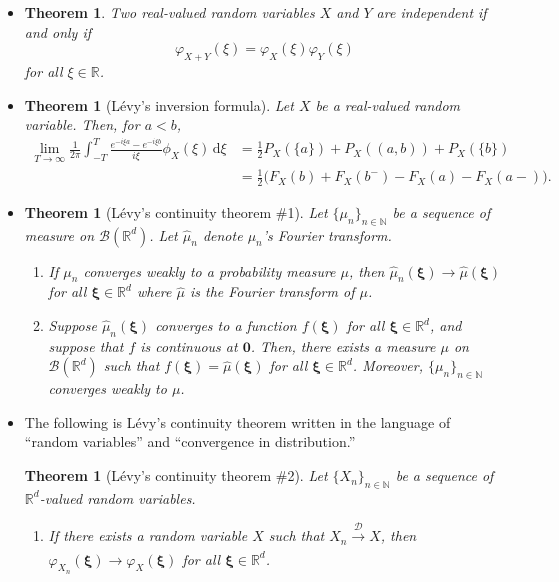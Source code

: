 \documentclass[10pt]{article}
\newtheorem{theorem}[lemma]{Theorem}
\numberwithin{lemma}{section}
\newcommand{\dee}{\mathrm{d}}
\newcommand{\ve}[1]{\mathbf{#1}}
\newcommand{\ves}[1]{\boldsymbol{#1}}
\newcommand{\ra}{\rightarrow}
\newcommand{\mcal}[1]{\mathcal{#1}}
\newcommand{\Real}{\mathbb{R}}
\newcommand{\Nat}{\mathbb{N}}
\begin{document}
\begin{itemize}
  \item \begin{theorem}
    Two real-valued random variables $X$ and $Y$ are independent if and only if $$\varphi_{X+Y}(\xi) = \varphi_X(\xi) \varphi_Y(\xi)$$ for all $\xi \in \Real$.
  \end{theorem}

  \item \begin{theorem}[L\'{e}vy's inversion formula]
    Let $X$ be a real-valued random variable. Then, for $a < b$,
    \begin{align*}
      \lim_{T \rightarrow \infty} \frac{1}{2\pi} \int_{-T}^T \frac{e^{-i\xi a} - e^{-i\xi b}}{i\xi} \phi_X(\xi)\, \dee\xi 
      &= \frac{1}{2} P_X(\{ a \}) + P_X((a,b)) + P_X(\{ b \}) \\
      &= \frac{1}{2}\Big( F_X(b) + F_X(b^-) - F_X(a) - F_X(a-) \Big).  
    \end{align*}
  \end{theorem}

  \item \begin{theorem}[L\'{e}vy's continuity theorem \#1]
    Let $\{ \mu_n \}_{n \in \Nat}$ be a sequence of measure on $\mcal{B}(\Real^d)$. Let $\hat{\mu}_n$ denote $\mu_n$'s Fourier transform.
    \begin{enumerate}
      \item If $\mu_n$ converges weakly to a probability measure $\mu$, then $\hat{\mu}_n(\ves{\xi})\ra \hat{\mu}(\ves{\xi})$ for all $\ves{\xi} \in \Real^d$ where $\hat{\mu}$ is the Fourier transform of $\mu$.
      
      \item Suppose $\hat{\mu}_n(\ves{\xi})$ converges to a function $f(\ves{\xi})$ for all $\ves{\xi} \in \Real^d$, and suppose that $f$ is continuous at $\ve{0}$. Then, there exists a measure $\mu$ on $\mcal{B}(\Real^d)$ such that $f(\ves{\xi}) = \hat{\mu}(\ves{\xi})$ for all $\ves{\xi} \in \Real^d$. Moreover, $\{ \mu_n \}_{n \in \Nat}$ converges weakly to $\mu$.
    \end{enumerate}    
  \end{theorem}
  
  \item The following is L\'{e}vy's continuity theorem written in the language of ``random variables'' and ``convergence in distribution.''
  
  \begin{theorem}[L\'{e}vy's continuity theorem \#2]
    Let $\{ X_n \}_{n \in \Nat}$ be a sequence of $\Real^d$-valued random variables.
    \begin{enumerate}
      \item If there exists a random variable $X$ such that $X_n \xrightarrow[]{\mcal{D}} X$, then $\varphi_{X_n}(\ves{\xi}) \ra \varphi_X(\ves{\xi})$ for all $\ves{\xi} \in \Real^d$.
      

\end{enumerate}
\end{theorem}
\end{itemize}
\end{document}

